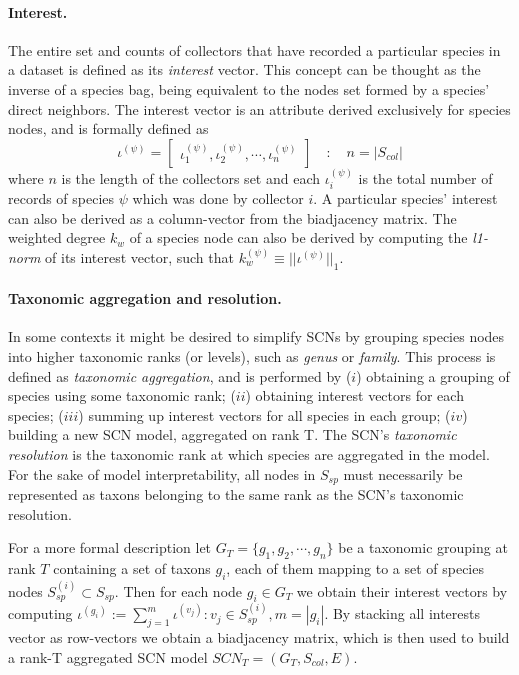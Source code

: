 \paragraph{Interest.} 
The entire set and counts of collectors that have recorded a particular species in a dataset is defined as its \textit{interest} vector. This concept can be thought as the inverse of a species bag, being equivalent to the nodes set formed by a species' direct neighbors. The interest vector is an attribute derived exclusively for species nodes, and is formally defined as
$$ 
\iota^{(\psi)} =  \begin{bmatrix}
\iota^{(\psi)}_1, \iota_2^{(\psi)}, \cdots, \iota_n^{(\psi)}
\end{bmatrix}  \quad : \quad 
n = |S_{col}|
$$
where $n$ is the length of the collectors set and each $\iota_i^{(\psi)}$ is the total number of records of species $\psi$ which was done by collector $i$. 
A particular species' interest can also be derived as a column-vector from the biadjacency matrix. 
The weighted degree $k_w$ of a species node can also be derived by computing the \textit{l1-norm} of its interest vector, such that $k_w^{(\psi)} \equiv || \iota^{(\psi)} ||_1 $.

\paragraph{Taxonomic aggregation and resolution.}
In some contexts it might be desired to simplify SCNs by grouping species nodes into higher taxonomic ranks (or levels), such as \textit{genus} or \textit{family}. This process is defined as \textit{taxonomic aggregation}, and is performed by 
($i$) obtaining a grouping of species using some taxonomic rank; 
($ii$) obtaining interest vectors for each species; 
($iii$) summing up interest vectors for all species in each group;
($iv$) building a new SCN model, aggregated on rank T. 
The SCN's \textit{taxonomic resolution} is the taxonomic rank at which species are aggregated in the model. For the sake of model interpretability, all nodes in $S_{sp}$ must necessarily be represented as taxons belonging to the same rank as the SCN's taxonomic resolution.

For a more formal description let $G_T = \{ g_1, g_2, \cdots, g_n \}$ be a taxonomic grouping at rank $T$ containing a set of taxons $g_i$, each of them mapping to a set of species nodes $S_{sp}^{(i)} \subset S_{sp}$. Then for each node $g_i \in G_T$ we obtain their interest vectors by computing $ \iota^{(g_i)} := \sum_{j=1}^{m} \iota^{(v_j)} : v_j \in S_{sp}^{(i)}, m = |g_i|$. By stacking all interests vector as row-vectors we obtain a biadjacency matrix, which is then used to build a rank-T aggregated SCN model $SCN_T = (G_T,S_{col},E)$.

